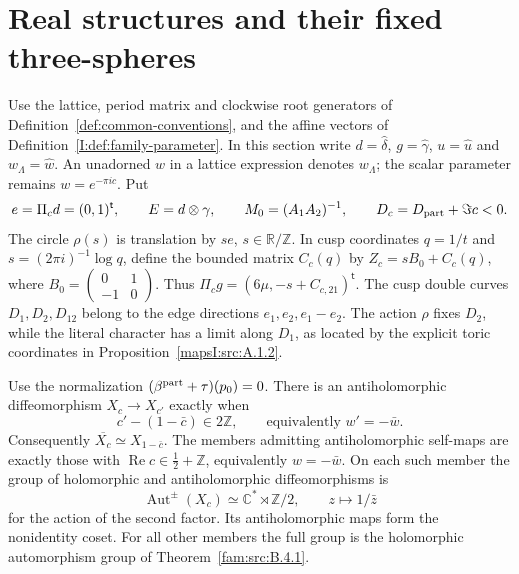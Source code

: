 \section{Real structures and their fixed three-spheres}\hypertarget{tag-02P9}{}\label{mapsI:real-forms}
\hypertarget{tag-01PJ}{}\label{fam:section:B.4}

\begin{definition}\hypertarget{tag-IP04}{}\label{I:def:real-period-data}
Use the lattice, period matrix and clockwise root generators of
Definition~\ref{def:common-conventions}, and the affine vectors of
Definition~\ref{I:def:family-parameter}. In this section write
$d=\widehat\delta$, $g=\widehat\gamma$, $u=\widehat u$ and
$w_\Lambda=\widehat w$. An unadorned $w$ in a lattice expression denotes
$w_\Lambda$; the scalar parameter remains $w=e^{-\pi ic}$. Put
\[
 e=\Pi_c d=(0,1)^{\mathsf t},\qquad E=d\otimes\gamma,
 \qquad M_0=(A_1A_2)^{-1},\qquad D_c=D_{\rm part}+\Im c<0.
\]
The circle $\rho(s)$ is translation by $se$, $s\in\mathbb R/\mathbb Z$.
In cusp coordinates $q=1/t$ and $s=(2\pi i)^{-1}\log q$, define the
bounded matrix $C_c(q)$ by $Z_c=sB_0+C_c(q)$, where
$B_0=\left(\begin{smallmatrix}0&1\\-1&0\end{smallmatrix}\right)$.
Thus $\Pi_cg=(6\mu,-s+C_{c,21})^{\mathsf t}$.
The cusp double curves $D_1,D_2,D_{12}$ belong to the edge directions
$e_1,e_2,e_1-e_2$. The action $\rho$ fixes $D_2$, while the literal
character has a limit along $D_1$, as located by the explicit toric
coordinates in Proposition~\ref{mapsI:src:A.1.2}.
\end{definition}

\begin{proposition}\hypertarget{tag-01QG}{}\label{fam:src:B.4.2}\label{fam:st:B.4.2}

Use the normalization $(\beta^{\rm part}+\tau)(p_0)=0$. There is an antiholomorphic diffeomorphism $X_c\to X_{c'}$ exactly when
\[
 c'-(1-\bar c)\in2\mathbb Z,
 \qquad\text{equivalently }w'=-\bar w.
\]
Consequently $\overline{X_c}\simeq X_{1-\bar c}$. The members admitting antiholomorphic self-maps are exactly those with $\operatorname{Re}c\in\tfrac12+\mathbb Z$, equivalently $w=-\bar w$. On each such member the group of holomorphic and antiholomorphic diffeomorphisms is
\[
 \operatorname{Aut}^{\pm}(X_c)\simeq\mathbb C^*\rtimes\mathbb Z/2,
 \qquad z\longmapsto1/\bar z
\]
for the action of the second factor. Its antiholomorphic maps form the nonidentity coset. For all other members the full group is the holomorphic automorphism group of Theorem~\ref{fam:src:B.4.1}.
\end{proposition}


